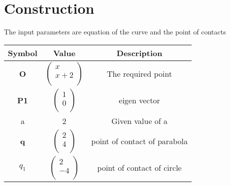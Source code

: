 \documentclass[journal,10pt,twocolumn]{article}
\begin{document}
\section*{Construction}
The input parameters are equation of the curve and the point of contacts \vspace{2mm}\\
{
\setlength\extrarowheight{2pt}
\begin{tabular}{|c|c|c|}
	\hline
	\textbf{Symbol}&\textbf{Value}&\textbf{Description}\\
	\hline
	\textbf{O}&$\begin{pmatrix}
	x\\
	x+2\\
	\end{pmatrix}$&The required point  \\
	\hline
	
	\textbf{P1}&$\begin{pmatrix}
	1\\
	0 \\
	\end{pmatrix}$&eigen vector\\
	\hline
	a&2&Given value of a\\
	\hline
	\textbf{q}&$\begin{pmatrix}
	2 \\
	4 \\
	\end{pmatrix}$&point of contact of parabola\\ 
	\hline
	\textbf{$q_1$}&$\begin{pmatrix}
	2\\
	-4
     \\
	\end{pmatrix}$&point of contact of circle \\
	\hline
\end{tabular}
}
\end{document}
